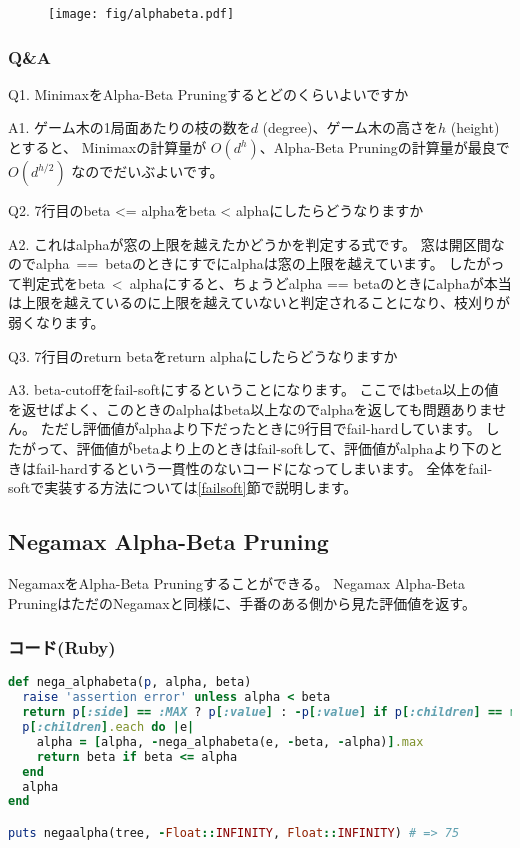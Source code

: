 \documentclass[11pt,a4paper]{ltjsarticle}
\begin{document}
\begin{figure}[h]
  \centering
  \texttt{[image: fig/alphabeta.pdf]}
  \caption{}
  \label{alphabeta}
\end{figure}


\subsubsection{Q\&A}


Q1. MinimaxをAlpha-Beta Pruningするとどのくらいよいですか

A1. ゲーム木の1局面あたりの枝の数を$d$ (degree)、ゲーム木の高さを$h$ (height)とすると、
Minimaxの計算量が $O(d^h)$、Alpha-Beta Pruningの計算量が最良で $O(d^{h/2})$ なのでだいぶよいです\cite{knuth1975alphabeta}。


\bigskip Q2. 7行目のbeta <= alphaをbeta < alphaにしたらどうなりますか

A2. これはalphaが窓の上限を越えたかどうかを判定する式です。
窓は開区間なので\mbox{alpha == beta}のときにすでにalphaは窓の上限を越えています。
したがって判定式を\mbox{beta < alpha}にすると、ちょうどalpha == betaのときにalphaが本当は上限を越えているのに上限を越えていないと判定されることになり、枝刈りが弱くなります。


\bigskip Q3. 7行目のreturn betaをreturn alphaにしたらどうなりますか

A3. beta-cutoffをfail-softにするということになります。
ここではbeta以上の値を返せばよく、このときのalphaはbeta以上なのでalphaを返しても問題ありません。
ただし評価値がalphaより下だったときに9行目でfail-hardしています。
したがって、評価値がbetaより上のときはfail-softして、評価値がalphaより下のときはfail-hardするという一貫性のないコードになってしまいます。
全体をfail-softで実装する方法については\ref{failsoft}節で説明します。


\subsection{Negamax Alpha-Beta Pruning}

NegamaxをAlpha-Beta Pruningすることができる。
Negamax Alpha-Beta PruningはただのNegamaxと同様に、手番のある側から見た評価値を返す。


\subsubsection{コード(Ruby)}

\begin{lstlisting}[language=ruby,caption=nega-alphabeta.rb]
def nega_alphabeta(p, alpha, beta)
  raise 'assertion error' unless alpha < beta
  return p[:side] == :MAX ? p[:value] : -p[:value] if p[:children] == nil
  p[:children].each do |e|
    alpha = [alpha, -nega_alphabeta(e, -beta, -alpha)].max
    return beta if beta <= alpha
  end
  alpha
end

puts negaalpha(tree, -Float::INFINITY, Float::INFINITY) # => 75
\end{lstlisting}
\end{document}
